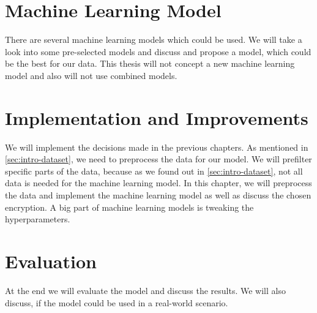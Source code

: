 \section{Machine Learning Model}
There are several machine learning models which could be used.
We will take a look into some pre-selected models and discuss and propose a model, which could be the best for our data.
This thesis will not concept a new machine learning model and also will not use combined models.

\section{Implementation and Improvements}
We will implement the decisions made in the previous chapters.
As mentioned in \ref{sec:intro-dataset}, we need to preprocess the data for our model.
We will prefilter specific parts of the data, because as we found out in \ref{sec:intro-dataset}, not all data is needed for the machine learning model.
In this chapter, we will preprocess the data and implement the machine learning model as well as discuss the chosen encryption. 
A big part of machine learning models is tweaking the hyperparameters.

\section{Evaluation}
At the end we will evaluate the model and discuss the results.
We will also discuss, if the model could be used in a real-world scenario.


